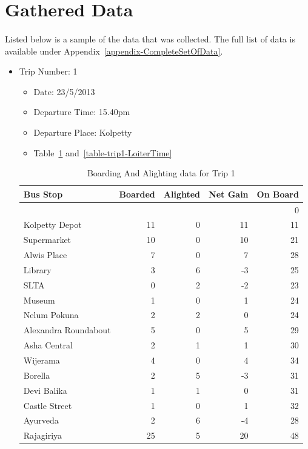 \documentclass[12pt, oneside]{report}
\begin{document}

\section {Gathered Data}
\label {GatheredData}

\paragraph{ } Listed below is a sample of the data that was collected. The full list of data is available under Appendix~\ref{appendix-CompleteSetOfData}.

\begin{itemize}

\item Trip Number: 1
\begin{itemize}
\item Date: 23/5/2013
\item Departure Time: 15.40pm
\item Departure Place: Kolpetty
\item Table~\ref{table-trip1-BoardingAndAlighting} and~\ref{table-trip1-LoiterTime}
\end{itemize}
\begin{table}[h!]
\centering
\begin{tabular}{|l|r|r|r|r|}
\hline
Bus Stop & Boarded & Alighted & Net Gain & On Board \\
\hline
 & & & & 0 \\
Kolpetty Depot	&11	&0	&11	&11\\
Supermarket	&10	&0	&10	&21\\
Alwis Place	&7	&0	&7	&28\\
Library	&3	&6	&-3	&25\\
SLTA	&0	&2	&-2	&23\\
\rowcolor[gray]{0.7}
Museum	&1	&0	&1	&24\\
Nelum Pokuna	&2	&2	&0	&24\\
\rowcolor[gray]{0.7}
Alexandra Roundabout	&5	&0	&5	&29\\
Asha Central	&2	&1	&1	&30\\
Wijerama	&4	&0	&4	&34\\
Borella	&2	&5	&-3	&31\\
Devi Balika	&1	&1	&0	&31\\
Castle Street	&1	&0	&1	&32\\
Ayurveda	&2	&6	&-4	&28\\
Rajagiriya	&25	&5	&20	&48\\
\hline
\end{tabular}
\caption{Boarding And Alighting data for Trip 1}
\label{table-trip1-BoardingAndAlighting}
\end{table}


\end{itemize}
\end{document}
